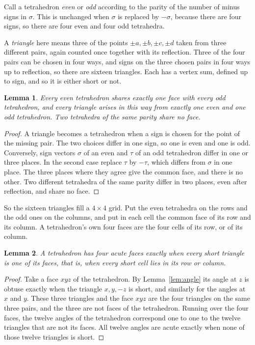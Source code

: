 \documentclass[11pt,a4paper]{article}
\newtheorem{lemma}{Lemma}
\begin{document}
Call a tetrahedron \emph{even} or \emph{odd} according to the parity of the
number of minus signs in $\sigma$. This is unchanged when $\sigma$ is
replaced by $-\sigma$, because there are four signs, so there are four even
and four odd tetrahedra.

A \emph{triangle} here means three of the points $\pm a,\pm b,\pm c,\pm d$
taken from three different pairs, again counted once together with its
reflection. Three of the four pairs can be chosen in four ways, and signs
on the three chosen pairs in four ways up to reflection, so there are
sixteen triangles. Each has a vertex sum, defined up to sign, and so it is
either short or not.

\begin{lemma}\label{lem:grid}
Every even tetrahedron shares exactly one face with every odd tetrahedron,
and every triangle arises in this way from exactly one even and one odd
tetrahedron. Two tetrahedra of the same parity share no face.
\end{lemma}

\begin{proof}
A triangle becomes a tetrahedron when a sign is chosen for the point of the
missing pair. The two choices differ in one sign, so one is even and one is
odd. Conversely, sign vectors $\sigma$ of an even and $\tau$ of an odd
tetrahedron differ in one or three places. In the second case replace $\tau$
by $-\tau$, which differs from $\sigma$ in one place. The three places where
they agree give the common face, and there is no other. Two different
tetrahedra of the same parity differ in two places, even after reflection,
and share no face.
\end{proof}

So the sixteen triangles fill a $4\times4$ grid. Put the even tetrahedra
on the rows and the odd ones on the columns, and put in each cell the
common face of its row and its column. A tetrahedron's own four faces are
the four cells of its row, or of its column.

\begin{lemma}\label{lem:criterion}
A tetrahedron has four acute faces exactly when every short triangle is
one of its faces, that is, when every short cell lies in its row or column.
\end{lemma}

\begin{proof}
Take a face $xyz$ of the tetrahedron. By Lemma~\ref{lem:angle} its angle
at $z$ is obtuse exactly when the triangle $x,y,-z$ is short, and similarly
for the angles at $x$ and $y$. These three triangles and the face $xyz$
are the four triangles on the same three pairs, and the three are not faces
of the tetrahedron. Running over the four faces, the twelve angles of the
tetrahedron correspond one to one to the twelve triangles that are not its
faces. All twelve angles are acute exactly when none of those twelve
triangles is short.
\end{proof}
\end{document}
